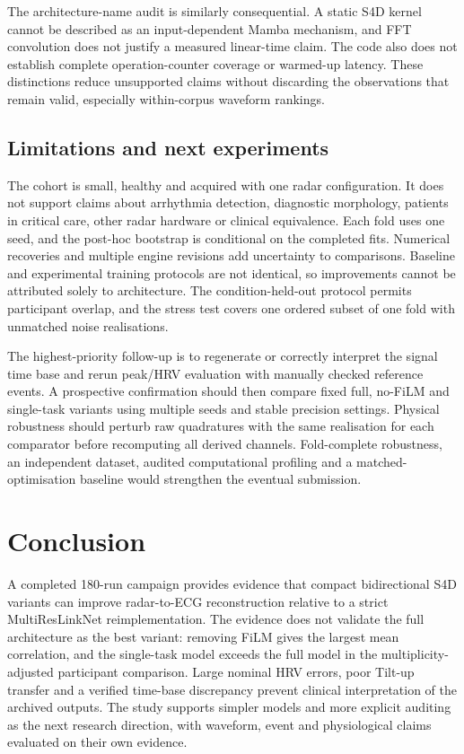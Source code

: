 \documentclass[11pt,a4paper]{article}
\begin{document}
The architecture-name audit is similarly consequential. A static S4D kernel cannot be
described as an input-dependent Mamba mechanism, and FFT convolution does not justify a
measured linear-time claim. The code also does not establish complete operation-counter
coverage or warmed-up latency. These distinctions reduce unsupported claims without
discarding the observations that remain valid, especially within-corpus waveform rankings.

\subsection{Limitations and next experiments}

The cohort is small, healthy and acquired with one radar configuration. It does not
support claims about arrhythmia detection, diagnostic morphology, patients in critical
care, other radar hardware or clinical equivalence. Each fold uses one seed, and the
post-hoc bootstrap is conditional on the completed fits. Numerical recoveries and multiple
engine revisions add uncertainty to comparisons. Baseline and experimental training
protocols are not identical, so improvements cannot be attributed solely to architecture.
The condition-held-out protocol permits participant overlap, and the stress test covers
one ordered subset of one fold with unmatched noise realisations.

The highest-priority follow-up is to regenerate or correctly interpret the signal time
base and rerun peak/HRV evaluation with manually checked reference events. A prospective
confirmation should then compare fixed full, no-FiLM and single-task variants using
multiple seeds and stable precision settings. Physical robustness should perturb raw
quadratures with the same realisation for each comparator before recomputing all derived
channels. Fold-complete robustness, an independent dataset, audited computational
profiling and a matched-optimisation baseline would strengthen the eventual submission.

\section{Conclusion}

A completed 180-run campaign provides evidence that compact bidirectional S4D variants can
improve radar-to-ECG reconstruction relative to a strict MultiResLinkNet reimplementation.
The evidence does not validate the full architecture as the best variant: removing FiLM
gives the largest mean correlation, and the single-task model exceeds the full model in
the multiplicity-adjusted participant comparison. Large nominal HRV errors, poor Tilt-up
transfer and a verified time-base discrepancy prevent clinical interpretation of the
archived outputs. The study supports simpler models and more explicit auditing as the
next research direction, with waveform, event and physiological claims evaluated on
their own evidence.
\end{document}
